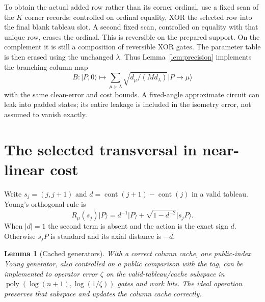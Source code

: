 \documentclass[11pt]{article}
\newtheorem{lemma}[theorem]{Lemma}
\theoremstyle{definition}
\newcommand{\ket}[1]{\lvert #1\rangle}
\newcommand{\poly}{\operatorname{poly}}
\newcommand{\cont}{\operatorname{cont}}
\begin{document}
To obtain the actual added row rather than its corner ordinal, use a fixed
scan of the $K$ corner records: controlled on ordinal equality, XOR the
selected row into the final blank tableau slot. A second fixed scan,
controlled on equality with that unique row, erases the ordinal. This is
reversible on the prepared support. On the complement it is still a
composition of reversible XOR gates. The parameter table is then erased
using the unchanged $\lambda$. Thus Lemma~\ref{lem:precision} implements
the branching column map
\begin{equation}\label{eq:B}
 B:\ket{P,0}\longmapsto
 \sum_{\mu\succ\lambda}\sqrt{d_\mu/(M d_\lambda)}\ket{P\to\mu}
\end{equation}
with the same clean-error and cost bounds. A fixed-angle approximate
circuit can leak into padded states; its entire leakage is included in the
isometry error, not assumed to vanish exactly.

\section{The selected transversal in near-linear cost}\label{sec:generators}

Write $s_j=(j,j+1)$ and $d=\cont(j+1)-\cont(j)$ in a valid tableau.
Young's orthogonal rule is
\[
 R_\mu(s_j)\ket P=d^{-1}\ket P+
 \sqrt{1-d^{-2}}\ket{s_jP}.
\]
When $|d|=1$ the second term is absent and the action is the exact sign $d$.
Otherwise $s_jP$ is standard and its axial distance is $-d$.

\begin{lemma}[Cached generators]\label{lem:generators}
With a correct column cache, one public-index Young generator, also
controlled on a public comparison with the tag, can be implemented to
operator error $\zeta$ on the valid-tableau/cache subspace in
$\poly(\log(n+1),\log(1/\zeta))$ gates and work bits. The ideal operation
preserves that subspace and updates the column cache correctly.
\end{lemma}
\end{document}
